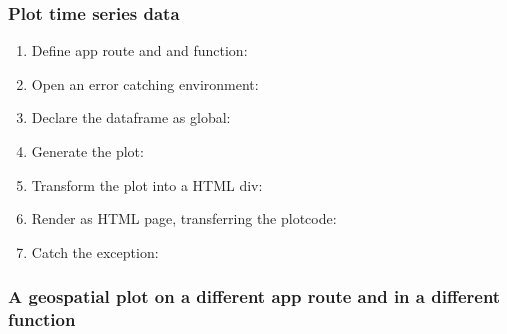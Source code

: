    \begin{frame}[allowframebreaks]\frametitle{Plot time series data}
   \begin{enumerate}
	\item  Define app route and and function:
     	
	\item Open an error catching environment:
	
	\item Declare the dataframe as global:
	
	\item Generate the plot:
	
	\item Transform the plot into a HTML div:
	
	\item Render as HTML page, transferring the plotcode:
	
	\newpage
	\item Catch the exception:
	
	\end{enumerate}
	
   \end{frame}
   
   
    \begin{frame}[allowframebreaks]\frametitle{A geospatial plot on a different app route and in a different function}
     	
   \end{frame}


